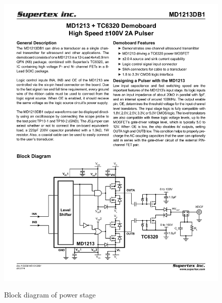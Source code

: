 \begin{figure}[htbp]
	\centering
	\includegraphics[width=\textwidth]{Figures/3_power_stage_block.pdf}
	\label{fig:3_power_stage}
	\caption{Block diagram of power stage \cite{MD1213DB1}}
\end{figure}
